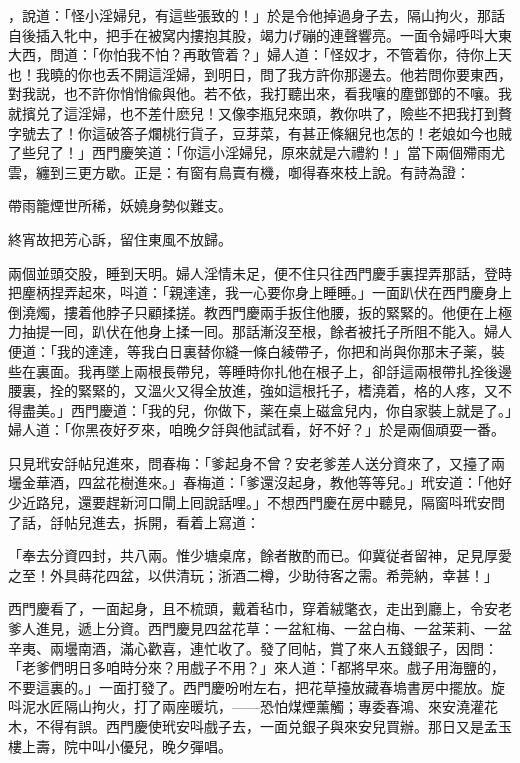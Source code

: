 ，說道：「怪小淫婦兒，有這些張致的！」於是令他掉過身子去，隔山拘火，那話自後插入牝中，把手在被窝内摟抱其股，竭力げ磞的連聲響亮。一面令婦呼呌大東大西，問道：「你怕我不怕？再敢管着？」婦人道：「怪奴才，不管着你，待你上天也！我曉的你也丢不開這淫婦，到明日，問了我方許你那邊去。他若問你要東西，對我説，也不許你悄悄偸與他。若不依，我打聽出來，看我嚷的塵鄧鄧的不嚷。我就擯兑了這淫婦，也不差什麽兒！又像李瓶兒來頭，教你哄了，險些不把我打到贅字號去了！你這破答子爛桃行貨子，豆芽菜，有甚正條綑兒也怎的！老娘如今也賊了些兒了！」西門慶笑道：「你這小淫婦兒，原來就是六禮約！」當下兩個殢雨尤雲，纏到三更方歇。正是：有窗有鳥賣有機，啣得春來枝上說。有詩為證：

\begin{myquote}
帶雨籠煙世所稀，妖嬈身勢似難支。

終宵故把芳心訴，留住東風不放歸。
\end{myquote}

兩個並頭交股，睡到天明。婦人淫情未足，便不住只往西門慶手裏捏弄那話，登時把麈柄捏弄起來，呌道：「親達達，我一心要你身上睡睡。」一面趴伏在西門慶身上倒澆燭，摟着他脖子只顧揉搓。教西門慶兩手扳住他腰，扳的緊緊的。他便在上極力抽提一囘，趴伏在他身上揉一囘。那話漸沒至根，餘者被托子所阻不能入。婦人便道：「我的達達，等我白日裏替你縫一條白綾帶子，你把和尚與你那末子薬，裝些在裏面。我再墜上兩根長帶兒，等睡時你扎他在根子上，卻㧱這兩根帶扎拴後邊腰裏，拴的緊緊的，又溫火又得全放進，強如這根托子，榰澆着，格的人疼，又不得盡美。」西門慶道：「我的兒，你做下，薬在桌上磁盒兒内，你自家裝上就是了。」婦人道：「你黑夜好歹來，咱晚夕㧱與他試試看，好不好？」於是兩個頑耍一番。

只見玳安㧱帖兒進來，問春梅：「爹起身不曾？安老爹差人送分資來了，又擡了兩壜金華酒，四盆花樹進來。」春梅道：「爹還沒起身，教他等等兒。」玳安道：「他好少近路兒，還要趕新河口閘上囘說話哩。」不想西門慶在房中聽見，隔窗呌玳安問了話，㧱帖兒進去，拆開，看着上寫道：

\begin{myquote}[\markfont]
「奉去分資四封，共八兩。惟少塘桌席，餘者散酌而已。仰冀従者留神，足見厚愛之至！外具蒔花四盆，以供清玩；浙酒二樽，少助待客之需。希莞納，幸甚！」
\end{myquote}

西門慶看了，一面起身，且不梳頭，戴着毡巾，穿着絨氅衣，走出到廳上，令安老爹人進見，遞上分資。西門慶見四盆花草：一盆紅梅、一盆白梅、一盆茉莉、一盆辛夷、兩壜南酒，滿心歡喜，連忙收了。發了囘帖，賞了來人五錢銀子，因問：「老爹們明日多咱時分來？用戲子不用？」來人道：「都將早來。戲子用海鹽的，不要這裏的。」一面打發了。西門慶吩咐左右，把花草擡放藏春塢書房中擺放。旋呌泥水匠隔山拘火，打了兩座暖坑，——恐怕煤煙薰觸；專委春鴻、來安澆灌花木，不得有誤。西門慶使玳安呌戲子去，一面兑銀子與來安兒買辦。那日又是孟玉樓上壽，院中叫小優兒，晚夕彈唱。


